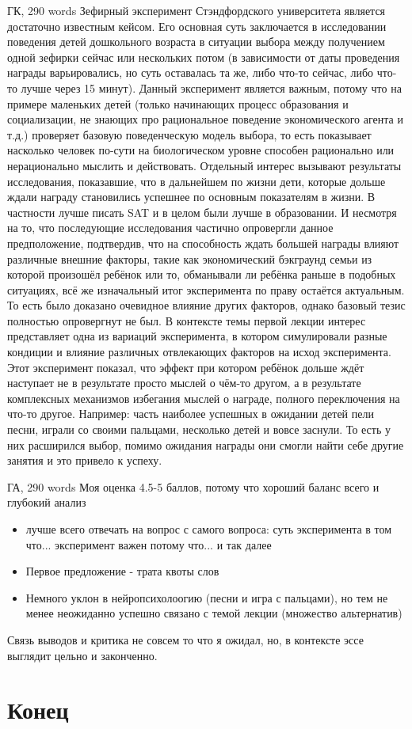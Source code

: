\documentclass{beamer}
\begin{document}
\begin{frame}{ГК, 290 words}
\tiny
Зефирный эксперимент Стэндфордского университета является достаточно известным кейсом. \alert{Его основная суть заключается в исследовании поведения детей дошкольного возраста в ситуации выбора между получением одной зефирки сейчас или нескольких потом (в зависимости от даты проведения награды варьировались, но суть оставалась та же, либо что-то сейчас, либо что-то лучше через 15 минут).} 
\alert{Данный эксперимент является важным, потому что на примере маленьких детей (только начинающих процесс образования и социализации, не знающих про рациональное поведение экономического агента и т.д.) проверяет базовую поведенческую модель выбора, то есть показывает насколько человек по-сути на биологическом уровне способен рационально или нерационально мыслить и действовать.} Отдельный интерес вызывают результаты исследования, показавшие, что в дальнейшем по жизни дети, которые дольше ждали награду становились успешнее по основным показателям в жизни. В частности лучше писать SAT и в целом были лучше в образовании. И несмотря на то, что последующие исследования частично опровергли данное предположение, подтвердив, что на способность ждать большей награды влияют различные внешние факторы, такие как экономический бэкграунд семьи из которой произошёл ребёнок или то, обманывали ли ребёнка раньше в подобных ситуациях, всё же изначальный итог эксперимента по праву остаётся актуальным. То есть было доказано очевидное влияние других факторов, однако базовый тезис полностью опровергнут не был.
\alert{В контексте темы первой лекции интерес представляет одна из вариаций эксперимента, в котором симулировали разные кондиции и влияние различных отвлекающих факторов на исход эксперимента.} Этот эксперимент показал, что эффект при котором ребёнок дольше ждёт наступает не в результате просто мыслей о чём-то другом, а в результате комплексных механизмов избегания мыслей о награде, полного переключения на что-то другое. \alert{Например: часть наиболее успешных в ожидании детей пели песни, играли со своими пальцами, несколько детей и вовсе заснули.} То есть у них расширился выбор, помимо ожидания награды они смогли найти себе другие занятия и это привело к успеху. 
\end{frame}

\begin{frame}{ГА, 290 words}
Моя оценка 4.5-5 баллов, потому что хороший баланс всего и глубокий анализ
\begin{itemize}
  \item лучше всего отвечать на вопрос с самого вопроса: суть эксперимента в том что... эксперимент важен потому что... и так далее
  \item Первое предложение - трата квоты слов
  \item Немного уклон в нейропсихолоогию (песни и игра с пальцами), но тем не менее неожиданно успешно связано с темой лекции (множество альтернатив)
\end{itemize}

Связь выводов и критика не совсем то что я ожидал, но, в контексте эссе выглядит цельно и законченно.

\end{frame}

\section{Конец}
\end{document}
